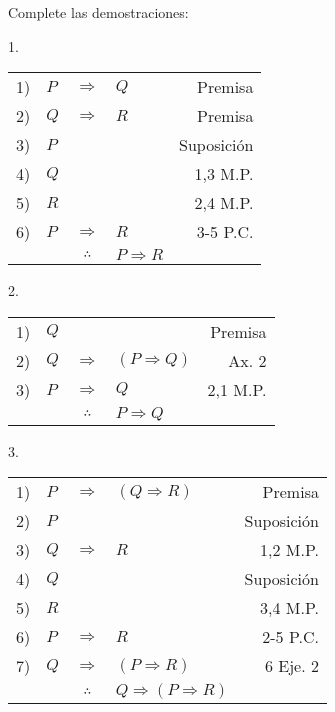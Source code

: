 \documentclass[12pt]{report}
\theoremstyle{largebreak}
\begin{document}
    \begin{excer}
        Complete las demostraciones:
        
        1.
        \begin{center}
            \begin{tabular}{l l c l r}
                1) & $P$ & $\Rightarrow$ & $Q$ & Premisa \\
                2) & $Q$ & $\Rightarrow$ & $R$ & Premisa \\
                3) & $P$ &  &  & Suposición \\
                4) & $Q$ &  &  & 1,3 M.P. \\
                5) & $R$ &  &  & 2,4 M.P. \\
                6) & $P$ & $\Rightarrow$ & $R$ & 3-5 P.C. \\
                \hline
                & & $\therefore$ & $P\Rightarrow R$ & \\
            \end{tabular}
        \end{center}

        2.
        \begin{center}
            \begin{tabular}{l l c l r}
                1) & $Q$ &  &  & Premisa \\
                2) & $Q$ & $\Rightarrow$ & $(P\Rightarrow Q)$ & Ax. 2 \\
                3) & $P$ & $\Rightarrow$ & $Q$ & 2,1 M.P. \\
                \hline
                & & $\therefore$ & $P\Rightarrow Q$ & \\
            \end{tabular}
        \end{center}

        3.
        \begin{center}
            \begin{tabular}{l l c l r}
                1) & $P$ & $\Rightarrow$ & $(Q\Rightarrow R)$ & Premisa\\
                2) & $P$ &  &  & Suposición\\
                3) & $Q$ & $\Rightarrow$ & $R$ & 1,2 M.P.\\
                4) & $Q$ &  &  & Suposición\\
                5) & $R$ &  &  & 3,4 M.P.\\
                6) & $P$ & $\Rightarrow$ & $R$ & 2-5 P.C.\\
                7) & $Q$ & $\Rightarrow$ & $(P\Rightarrow R)$ & 6 Eje. 2\\
                \hline
                & & $\therefore$ & $Q\Rightarrow (P\Rightarrow R)$ & \\
            \end{tabular}
        \end{center}


\end{excer}
\end{document}
